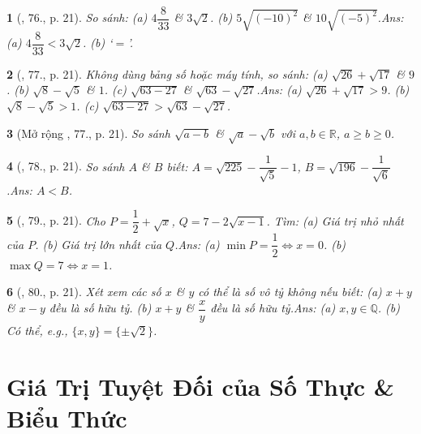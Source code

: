 \documentclass{article}
\newtheorem{baitoan}{}
\begin{document}
\begin{baitoan}[\cite{Tuyen_Toan_7}, 76., p. 21]
	So sánh: (a) $4\dfrac{8}{33}$ \& $3\sqrt{2}$. (b) $5\sqrt{(-10)^2}$ \& $10\sqrt{(-5)^2}$.\hfill{\sf Ans:} (a) $4\dfrac{8}{33} < 3\sqrt{2}$. (b) `$=$'.
\end{baitoan}

\begin{baitoan}[\cite{Tuyen_Toan_7}, 77., p. 21]
	Không dùng bảng số hoặc máy tính, so sánh: (a) $\sqrt{26} + \sqrt{17}$ \& $9$. (b) $\sqrt{8} - \sqrt{5}$ \& $1$. (c) $\sqrt{63 - 27}$ \& $\sqrt{63} - \sqrt{27}$.\hfill{\sf Ans:} (a) $\sqrt{26} + \sqrt{17} > 9$. (b) $\sqrt{8} - \sqrt{5} > 1$. (c) $\sqrt{63 - 27} > \sqrt{63} - \sqrt{27}$.
\end{baitoan}

\begin{baitoan}[Mở rộng \cite{Tuyen_Toan_7}, 77., p. 21]
	So sánh $\sqrt{a - b}$ \& $\sqrt{a} - \sqrt{b}$ với $a,b\in\mathbb{R}$, $a\ge b\ge 0$.
\end{baitoan}

\begin{baitoan}[\cite{Tuyen_Toan_7}, 78., p. 21]
	So sánh $A$ \& $B$ biết: $A = \sqrt{225} - \dfrac{1}{\sqrt{5}} - 1$, $B = \sqrt{196} - \dfrac{1}{\sqrt{6}}$.\hfill{\sf Ans:} $A < B$.
\end{baitoan}

\begin{baitoan}[\cite{Tuyen_Toan_7}, 79., p. 21]
	Cho $P = \dfrac{1}{2} + \sqrt{x}$, $Q = 7 - 2\sqrt{x - 1}$. Tìm: (a) Giá trị nhỏ nhất của $P$. (b) Giá trị lớn nhất của $Q$.\hfill{\sf Ans:} (a) $\min P = \dfrac{1}{2}\Leftrightarrow x = 0$. (b) $\max Q = 7\Leftrightarrow x = 1$.
\end{baitoan}

\begin{baitoan}[\cite{Tuyen_Toan_7}, 80., p. 21]
	Xét xem các số $x$ \& $y$ có thể là số vô tỷ không nếu biết: (a) $x + y$ \& $x - y$ đều là số hữu tỷ. (b) $x + y$ \& $\dfrac{x}{y}$ đều là số hữu tỷ.\hfill{\sf Ans:} (a) $x,y\in\mathbb{Q}$. (b) Có thể, e.g., $\{x,y\} = \{\pm\sqrt{2}\}$.
\end{baitoan}


\section{Giá Trị Tuyệt Đối của  Số Thực \& Biểu Thức}
\end{document}
